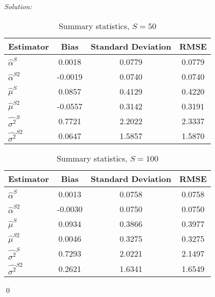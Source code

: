 \documentclass[12pt]{article}
\newenvironment{sol}
    {\emph{Solution:}
    }
    {
    \qed
    }
\begin{document}
\begin{sol}
    \begin{enumerate}[label=\alph*) ]
        
        \begin{table}[htbp]
            \centering
            \caption{Summary statistics, $S = 50$}
              \begin{tabular}{lccc}
                  \toprule
                    Estimator                & Bias             & Standard Deviation         & RMSE           \\
                  \midrule
                    $\hat{\alpha}^S $     &  0.0018       & 0.0779     &     0.0779      \\
                    $\hat{\alpha}^{S2}$   & -0.0019 &  0.0740     &  0.0740             \\
                    $\hat{\mu}^S $     &  0.0857     &  0.4129  &  0.4220        \\
                    $\hat{\mu}^{S2}$   & -0.0557 &  0.3142   & 0.3191            \\
                    $\hat{\sigma^2}^S $     & 0.7721    &  2.2022    &   2.3337     \\
                    $\hat{\sigma^2}^{S2}$   & 0.0647 &  1.5857   &   1.5870           \\
                  \bottomrule
              \end{tabular}
            \label{tab:cf10}
          \end{table}

          \begin{table}[htbp]
            \centering
            \caption{Summary statistics, $S = 100$}
              \begin{tabular}{lccc}
                  \toprule
                    Estimator                & Bias             & Standard Deviation         & RMSE           \\
                  \midrule
                    $\hat{\alpha}^S $     & 0.0013  & 0.0758 &  0.0758   \\
                    $\hat{\alpha}^{S2}$   &-0.0030 & 0.0750  &   0.0750       \\
                    $\hat{\mu}^S $     &  0.0934  & 0.3866 &   0.3977  \\
                    $\hat{\mu}^{S2}$   &  0.0046& 0.3275  &    0.3275     \\
                    $\hat{\sigma^2}^S $     & 0.7293  &  2.0221&   2.1497  \\
                    $\hat{\sigma^2}^{S2}$   & 0.2621 &  1.6341&   1.6549      \\
                  \bottomrule
              \end{tabular}
            \label{tab:cf10}
          \end{table}
        \end{enumerate}
        

\end{sol}
\end{document}
